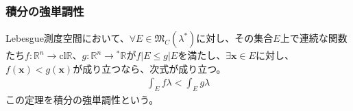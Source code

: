 \documentclass[dvipdfmx]{jsarticle}
\begin{document}
\subsubsection{積分の強単調性}%
\begin{thm}[積分の強単調性]\label{4.6.6.6}
Lebesgue測度空間において、$\forall E \in \mathfrak{M}_{C}\left( \lambda^{*} \right)$に対し、その集合$E$上で連続な関数たち$f:\mathbb{R}^{n} \rightarrow \mathrm{cl}\mathbb{R}$、$g:\mathbb{R}^{n} \rightarrow{}^{*}\mathbb{R}$が$f|E \leq g|E$を満たし、$\exists\mathbf{x} \in E$に対し、$f\left( \mathbf{x} \right) < g\left( \mathbf{x} \right)$が成り立つなら、次式が成り立つ。
\begin{align*}
\int_{E} {f\lambda} < \int_{E} {g\lambda}
\end{align*}
この定理を積分の強単調性という。
\end{thm}
\end{document}
